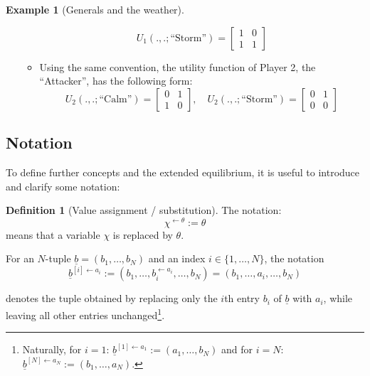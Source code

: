 \documentclass{article}
\theoremstyle{definition}
\newtheorem{definition}{Definition}[section]
\newtheorem*{example}{Example}
\begin{document}
\begin{example}[Generals and the weather]
\begin{itemize}
\begin{itemize}
\[        U_1(.,.;\text{``Storm''}) =
        \begin{bmatrix}
            1 & 0 \\
            1 & 1
        \end{bmatrix}
        \]
        \item Using the same convention, the  utility function of Player 2, the ``Attacker'', has the following form: 
        \[
        U_2(.,.;\text{``Calm''}) =
        \begin{bmatrix}
            0 & 1 \\
            1 & 0
        \end{bmatrix}, \quad
        U_2(.,.;\text{``Storm''}) =
        \begin{bmatrix}
            0 & 1 \\
            0 & 0
        \end{bmatrix}
        \]
    \end{itemize}
\end{itemize}

\end{example}

\subsection{Notation}

To define further concepts and the extended equilibrium, it is useful to introduce and clarify some notation: 

\begin{definition}[Value assignment / substitution]
The notation:
\begin{equation}
    \chi^{\leftarrow \theta} := \theta
\end{equation}
means that a variable $\chi$ is replaced by $\theta$. 

For an $N$-tuple $\underline{b} = (b_1,\dots,b_N)$ and an index $i \in \{1,\dots,N\}$, the notation
    \begin{equation}
        \underline{b}^{[i] \leftarrow a_i} 
        :=
        (b_1,\dots,b_i^{\leftarrow a_i},\dots,b_N)
        =
        (b_1,\dots,a_i,\dots,b_N)
    \end{equation}
    
denotes the tuple obtained by replacing only the $i$th entry $b_i$ of $\underline{b}$ with $a_i$, while leaving all other entries unchanged\footnote{Naturally, for $i=1$: $\underline{b}^{[1] \leftarrow a_1} := (a_1,\dots,b_N)$ and for $i=N$: $\underline{b}^{[N] \leftarrow a_N} := (b_1,\dots,a_N)$.}.

\end{definition}
\end{document}

